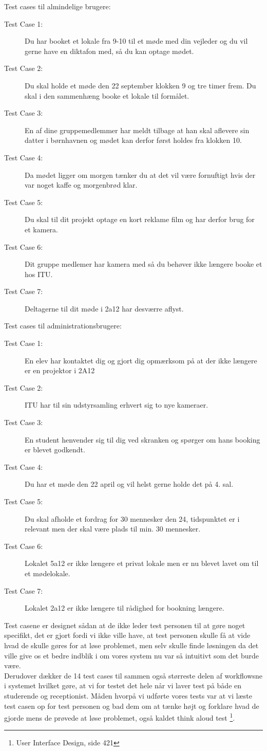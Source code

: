 Test cases til almindelige brugere:
\begin{description}
\item[Test Case 1:] Du har booket et lokale fra 9-10 til et møde med din vejleder og du vil gerne have en diktafon med, så du kan optage mødet.
\item[Test Case 2:] Du skal holde et møde den 22 september klokken 9 og tre timer frem. Du skal i den sammenhæng booke et lokale til formålet.
\item[Test Case 3:] En af dine gruppemedlemmer har meldt tilbage at han skal aflevere sin datter i børnhavnen og mødet kan derfor først holdes fra klokken 10.
\item[Test Case 4:] Da mødet ligger om morgen tænker du at det vil være fornuftigt hvis der var noget kaffe og morgenbrød klar.
\item[Test Case 5:] Du skal til dit projekt optage en kort reklame film og har derfor brug for et kamera.
\item[Test Case 6:] Dit gruppe medlemer har kamera med så du behøver ikke længere booke et hos ITU.
\item[Test Case 7:] Deltagerne til dit møde i 2a12 har desværre aflyst.
\end{description}
Test cases til administrationsbrugere:
\begin{description}
\item[Test Case 1:] En elev har kontaktet dig og gjort dig opmærksom på at der ikke længere er en projektor i 2A12
\item[Test Case 2:] ITU har til sin udstyrsamling erhvert sig to nye kameraer.
\item[Test Case 3:] En student henvender sig til dig ved skranken og spørger om hans booking er blevet godkendt.
\item[Test Case 4:] Du har et møde den 22 april og vil helst gerne holde det på 4. sal.
\item[Test Case 5:] Du skal afholde et fordrag for 30 mennesker den 24, tidspunktet er i relevant men der skal være plads til min. 30 mennesker.
\item[Test Case 6:] Lokalet 5a12 er ikke længere et privat lokale men er nu blevet lavet om til et mødelokale.
\item[Test Case 7:] Lokalet 2a12 er ikke længere til rådighed for bookning længere.
\end{description}

Test casene er designet sådan at de ikke leder test personen til at gøre noget specifikt, det er gjort fordi vi ikke ville have, at test personen skulle få at vide hvad de skulle gøres for at løse problemet, men selv skulle finde løsningen da det ville give os et bedre indblik i om vores system nu var så intuitivt som det burde være.\\ Derudover dækker de 14 test cases til sammen også størreste delen af workflowsne i systemet hvilket gøre, at vi for testet det hele når vi laver test på både en studerende og receptionist. Måden hvorpå vi udførte vores tests var at vi læste test casen op for test personen og  bad dem om at tænke højt og forklare hvad de gjorde mens de prøvede at løse problemet, også kaldet think aloud test \footnote{User Interface Design, side 421}. 


